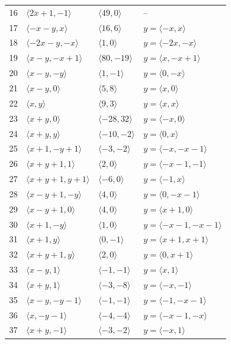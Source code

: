 \documentclass[11pt]{article}
\begin{document}
\begin{longtable}{@{}rlll@{}}
16 & $\langle 2x+1,-1\rangle$ & $\langle 49,0\rangle$ & --\\
17 & $\langle -x-y,x\rangle$ & $\langle 16,6\rangle$ & $y=\langle -x,x\rangle$\\
18 & $\langle -2x-y,-x\rangle$ & $\langle 1,0\rangle$ & $y=\langle -2x,-x\rangle$\\
19 & $\langle x-y,-x+1\rangle$ & $\langle 80,-19\rangle$ & $y=\langle x,-x+1\rangle$\\
20 & $\langle x-y,-y\rangle$ & $\langle 1,-1\rangle$ & $y=\langle 0,-x\rangle$\\
21 & $\langle x-y,0\rangle$ & $\langle 5,8\rangle$ & $y=\langle x,0\rangle$\\
22 & $\langle x,y\rangle$ & $\langle 9,3\rangle$ & $y=\langle x,x\rangle$\\
23 & $\langle x+y,0\rangle$ & $\langle -28,32\rangle$ & $y=\langle -x,0\rangle$\\
24 & $\langle x+y,y\rangle$ & $\langle -10,-2\rangle$ & $y=\langle 0,x\rangle$\\
25 & $\langle x+1,-y+1\rangle$ & $\langle -3,-2\rangle$ & $y=\langle -x,-x-1\rangle$\\
26 & $\langle x+y+1,1\rangle$ & $\langle 2,0\rangle$ & $y=\langle -x-1,-1\rangle$\\
27 & $\langle x+y+1,y+1\rangle$ & $\langle -6,0\rangle$ & $y=\langle -1,x\rangle$\\
28 & $\langle x-y+1,-y\rangle$ & $\langle 4,0\rangle$ & $y=\langle 0,-x-1\rangle$\\
29 & $\langle x-y+1,0\rangle$ & $\langle 4,0\rangle$ & $y=\langle x+1,0\rangle$\\
30 & $\langle x+1,-y\rangle$ & $\langle 1,0\rangle$ & $y=\langle -x-1,-x-1\rangle$\\
31 & $\langle x+1,y\rangle$ & $\langle 0,-1\rangle$ & $y=\langle x+1,x+1\rangle$\\
32 & $\langle x+y+1,y\rangle$ & $\langle 2,0\rangle$ & $y=\langle 0,x+1\rangle$\\
33 & $\langle x-y,1\rangle$ & $\langle -1,-1\rangle$ & $y=\langle x,1\rangle$\\
34 & $\langle x+y,1\rangle$ & $\langle -3,-8\rangle$ & $y=\langle -x,-1\rangle$\\
35 & $\langle x-y,-y-1\rangle$ & $\langle -1,-1\rangle$ & $y=\langle -1,-x-1\rangle$\\
36 & $\langle x,-y-1\rangle$ & $\langle -4,-4\rangle$ & $y=\langle -x-1,-x\rangle$\\
37 & $\langle x+y,-1\rangle$ & $\langle -3,-2\rangle$ & $y=\langle -x,1\rangle$\\

\end{longtable}
\end{document}
